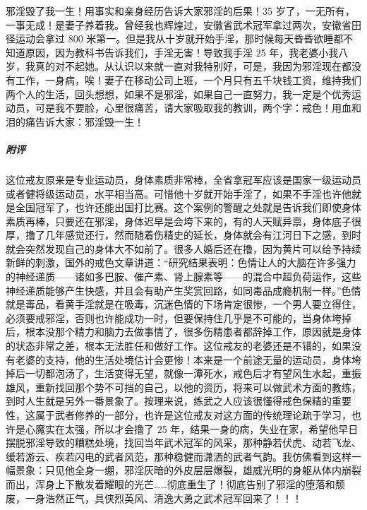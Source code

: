 \begin{case}
    邪淫毁了我一生！用事实和亲身经历告诉大家邪淫的后果！35 岁了，一无所有，一事无成！是妻子养着我。曾经我也辉煌过，安徽省武术冠军拿过两次，安徽省田径运动会拿过 800 米第一。但是我从十岁就开始手淫，那时候每天昏昏欲睡都不知道原因，因为教科书告诉我们，手淫无害！导致我手淫 25 年，我老婆小我八岁，我真的对不起她。从认识以来就一直对我特别好，可是，我因为邪淫现在都没有工作，一身病，唉！妻子在移动公司上班，一个月只有五千块钱工资，维持我们两个人的生活，回头想想，如果不是邪淫，如果自己一直努力，我一定是个优秀运动员，可是我不要脸，心里很痛苦，请大家吸取我的教训，两个字：戒色！用血和泪的痛告诉大家：邪淫毁一生！
    \subparagraph{附评} 这位戒友原来是专业运动员，身体素质非常棒，全省拿冠军应该是国家一级运动员或者健将级运动员，水平相当高。可惜他十岁就开始手淫了，如果不手淫也许他就是全国冠军了，也许还能出国打比赛。这个案例的警醒之处就是告诉我们即使身体素质再棒，只要还在邪淫，身体迟早是会垮下来的，有的人天赋异禀，身体底子很厚，撸了几年感觉还行，然而随着伤精史的延长，身体就会有江河日下之感，到时就会突然发现自己的身体大不如前了。很多人婚后还在撸，因为黄片可以给予持续新鲜的刺激，国外的戒色文章讲道：“研究结果表明：色情让人的大脑在许多强力的神经递质——诸如多巴胺、催产素、肾上腺素等——的混合中超负荷运作，这些神经递质能够产生快感，并且会有助产生奖赏回路，如同毒品成瘾机制一样。”色情就是毒品，看黄手淫就是在吸毒，沉迷色情的下场肯定很惨，一个男人要立得住，必须要戒邪淫，否则也许能成功一时，但要保持住几乎是不可能的，当身体垮掉后，根本没那个精力和脑力去做事情了，很多伤精患者都辞掉工作，原因就是身体的状态非常之差，根本无法胜任和做好工作。这位戒友的老婆还是不错的，如果没有老婆的支持，他的生活处境估计会更惨！本来是一个前途无量的运动员，身体垮掉后一切都泡汤了，生活变得无望，就像一潭死水，戒色后才有望风生水起，重振雄风，重新找回那个势不可挡的自己，以他的资历，将来可以做武术方面的教练，到时人生就是另外一番景象了。按理来说，练武之人应该很懂得戒色保精的重要性，这属于武者修养的一部分，也许是这位戒友对这方面的传统理论疏于学习，也许是心魔实在太强，所以才会撸了 25 年，结果一身的病，失业在家，希望他早日摆脱邪淫导致的糟糕处境，找回当年武术冠军的风采，那种静若伏虎、动若飞龙、缓若游云、疾若闪电的武者风范，那种稳健而潇洒的武者气韵。我仿佛看到这样一幅景象：只见他全身一绷，邪淫灰暗的外皮层层爆裂，雄威光明的身躯从体内崩裂而出，浑身上下散发着耀眼的光芒……彻底重生了！彻底告别了邪淫的堕落和颓废，一身浩然正气，具侠烈英风、清逸大勇之武术冠军回来了！！！
\end{case}

